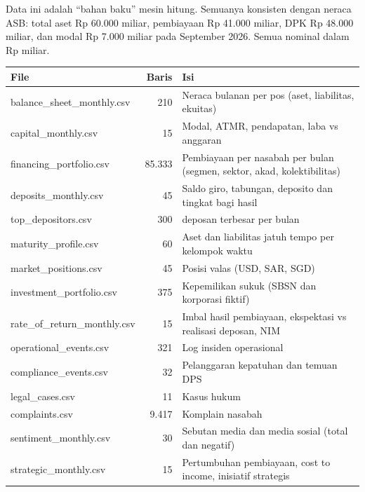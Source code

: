 \documentclass[11pt,a4paper]{article}
\begin{document}
Data ini adalah ``bahan baku'' mesin hitung. Semuanya konsisten dengan neraca ASB: total aset Rp 60.000 miliar, pembiayaan Rp 41.000 miliar, DPK Rp 48.000 miliar, dan modal Rp 7.000 miliar pada September 2026. Semua nominal dalam Rp miliar.

\begin{longtable}{>{\ttfamily\small\raggedright\arraybackslash}p{4.8cm}r>{\raggedright\arraybackslash}p{7.6cm}}
\toprule
\textrm{\textbf{File}} & \textbf{Baris} & \textbf{Isi} \\
\midrule
\endhead
balance\_\allowbreak{}sheet\_\allowbreak{}monthly.csv & 210 & Neraca bulanan per pos (aset, liabilitas, ekuitas) \\
capital\_\allowbreak{}monthly.csv & 15 & Modal, ATMR, pendapatan, laba vs anggaran \\
financing\_\allowbreak{}portfolio.csv & 85.333 & Pembiayaan per nasabah per bulan (segmen, sektor, akad, kolektibilitas) \\
deposits\_\allowbreak{}monthly.csv & 45 & Saldo giro, tabungan, deposito dan tingkat bagi hasil \\
top\_\allowbreak{}depositors.csv & 300 & 20 deposan terbesar per bulan \\
maturity\_\allowbreak{}profile.csv & 60 & Aset dan liabilitas jatuh tempo per kelompok waktu \\
market\_\allowbreak{}positions.csv & 45 & Posisi valas (USD, SAR, SGD) \\
investment\_\allowbreak{}portfolio.csv & 375 & Kepemilikan sukuk (SBSN dan korporasi fiktif) \\
rate\_\allowbreak{}of\_\allowbreak{}return\_\allowbreak{}monthly.csv & 15 & Imbal hasil pembiayaan, ekspektasi vs realisasi deposan, NIM \\
operational\_\allowbreak{}events.csv & 321 & Log insiden operasional \\
compliance\_\allowbreak{}events.csv & 32 & Pelanggaran kepatuhan dan temuan DPS \\
legal\_\allowbreak{}cases.csv & 11 & Kasus hukum \\
complaints.csv & 9.417 & Komplain nasabah \\
sentiment\_\allowbreak{}monthly.csv & 30 & Sebutan media dan media sosial (total dan negatif) \\
strategic\_\allowbreak{}monthly.csv & 15 & Pertumbuhan pembiayaan, cost to income, inisiatif strategis \\
\bottomrule
\end{longtable}
\end{document}
